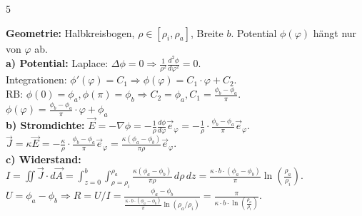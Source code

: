 \documentclass[a4paper, 2pt, landscape]{extarticle}
\begin{document}
\begin{multicols*}{5}
\begin{tcolorbox}[title={Kreisbogen \normalfont(azimutal entlang des bogens ($\phi$))}, colback=col2, colframe=boxtitle]
\textbf{Geometrie:} Halbkreisbogen, $\rho \in [\rho_i, \rho_a]$, Breite $b$. Potential $\phi(\varphi)$ hängt nur von $\varphi$ ab. \\
\textbf{a) Potential:} Laplace: $\Delta \phi = 0 \Rightarrow \frac{1}{\rho^2} \frac{d^2\phi}{d\varphi^2} = 0$. \\
Integrationen: $\phi'(\varphi) = C_1 \Rightarrow \phi(\varphi) = C_1 \cdot \varphi + C_2$. \\
RB: $\phi(0)=\phi_a, \phi(\pi)=\phi_b \Rightarrow C_2 = \phi_a, C_1 = \frac{\phi_b-\phi_a}{\pi}$. \\
$\boxed{\phi(\varphi) = \frac{\phi_b-\phi_a}{\pi} \cdot \varphi + \phi_a}$ \\
\textbf{b) Stromdichte:} $\vec{E} = -\nabla \phi = -\frac{1}{\rho} \frac{d\phi}{d\varphi} \vec{e}_\varphi = -\frac{1}{\rho} \cdot \frac{\phi_b-\phi_a}{\pi} \vec{e}_\varphi$. \\
$\vec{J} = \kappa \vec{E} = -\frac{\kappa}{\rho} \cdot \frac{\phi_b-\phi_a}{\pi} \vec{e}_\varphi = \frac{\kappa(\phi_a-\phi_b)}{\pi \rho} \vec{e}_\varphi$. \\
\textbf{c) Widerstand:} $I = \iint \vec{J} \cdot d\vec{A} = \int_{z=0}^b \int_{\rho=\rho_i}^{\rho_a} \frac{\kappa(\phi_a-\phi_b)}{\pi \rho} \, d\rho \, dz = \frac{\kappa \cdot b \cdot (\phi_a-\phi_b)}{\pi} \ln\left(\frac{\rho_a}{\rho_i}\right)$. \\
$U = \phi_a - \phi_b \Rightarrow R = U/I = \frac{\phi_a-\phi_b}{\frac{\kappa \cdot b \cdot (\phi_a-\phi_b)}{\pi} \ln(\rho_a/\rho_i)} = \boxed{\frac{\pi}{\kappa \cdot b \cdot \ln(\frac{\rho_a}{\rho_i})}}$.
\end{tcolorbox}


\end{multicols*}
\end{document}
